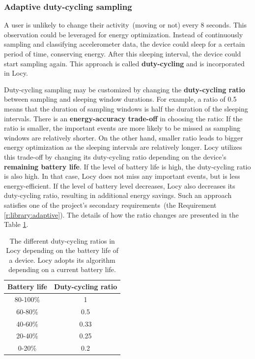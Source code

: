 \subsubsection{Adaptive duty-cycling sampling}
\label{s:design:locy:adaptive}
\hspace{10pt}A user is unlikely to change their activity\ (moving or not) every 8 seconds. This observation could be leveraged for energy optimization. Instead of continuously sampling and classifying accelerometer data, the device could sleep for a certain period of time, conserving energy. After this sleeping interval, the device could start sampling again. This approach is called \textbf{duty-cycling} and is incorporated in Locy. 

Duty-cycling sampling may be customized by changing the \textbf{duty-cycling ratio} between sampling and sleeping window  durations. For example, a ratio of 0.5 means that the duration of sampling windows is half the duration of the sleeping intervals. There is an \textbf{energy-accuracy trade-off} in choosing the ratio: If the ratio is smaller, the important events are more likely to be missed as sampling windows are relatively shorter. On the other hand, smaller ratio leads to bigger energy optimization as the sleeping intervals are relatively longer. Locy utilizes this trade-off by changing its duty-cycling ratio depending on the device's \textbf{remaining battery life}. If the level of battery life is high, the duty-cycling ratio is also high. In that case, Locy does not miss any important events, but is less energy-efficient. If the level of battery level decreases, Locy also decreases its duty-cycling ratio, resulting in additional energy savings. Such an approach satisfies one of the project's secondary requirements\ (the Requirement \ref{r:library:adaptive}). The details of how the ratio changes are presented in the Table \ref{table:locy:dutycyclingratio}.

\begin{table}[H]
	\centering
    \begin{tabular}{| c | c | }
    \hline
    Battery life & Duty-cycling ratio \\ \hline
    80-100\% & 1 \\ \hline
    60-80\% & 0.5\\ \hline
    40-60\% & 0.33\\ \hline
    20-40\% & 0.25\\ \hline
    0-20\% & 0.2 \\ \hline
    \end{tabular}
    \caption{The different duty-cycling ratios in Locy depending on the battery life of a device. Locy adopts its algorithm depending on a current battery life. }
	\label{table:locy:dutycyclingratio}
\end{table}	

